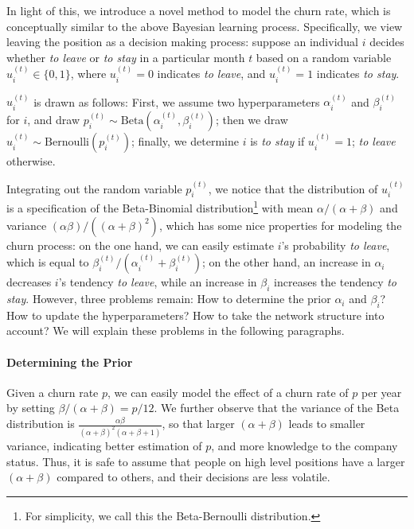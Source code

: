 \documentclass[tcn = 37075, sheet = false, abstract = false]{mcmthesis}
\begin{document}
	In light of this, we introduce a novel method to model the churn rate, which is conceptually similar to the above Bayesian learning process. Specifically, we view leaving the position as a decision making process: suppose an individual $i$ decides whether \textit{to leave} or \textit{to stay} in a particular month $t$ based on a random variable $u_{i}^{(t)} \in \{0, 1\}$, where $u_{i}^{(t)} = 0$ indicates \textit{to leave}, and $u_{i}^{(t)}=1$ indicates \textit{to stay}. 
	
	$u_{i}^{(t)}$ is drawn as follows: First, we assume two hyperparameters $\alpha_{i}^{(t)}$ and $\beta_{i}^{(t)}$ for $i$, and draw $\displaystyle   p_{i}^{(t)} \sim \mathrm{Beta}(\alpha_{i}^{(t)}, \beta_{i}^{(t)})$; then we draw $\displaystyle u_{i}^{(t)} \sim \mathrm{Bernoulli}(p_{i}^{(t)})$; finally, we determine $i$ is \textit{to stay} if $u_{i}^{(t)}=1$; \textit{to leave} otherwise.
	
	Integrating out the random variable $p_{i}^{(t)}$, we notice that the distribution of $u_{i}^{(t)}$ is a specification of the Beta-Binomial distribution\footnote{For simplicity, we call this the Beta-Bernoulli distribution.} with mean $\alpha / (\alpha + \beta)$ and variance $(\alpha\beta)/((\alpha+\beta)^2)$, which has some nice properties for modeling the churn process: on the one hand, we can easily estimate $i$'s probability \textit{to leave}, which is equal to $\beta_{i}^{(t)} /(\alpha_{i}^{(t)}+\beta_{i}^{(t)})$; on the other hand, an increase in $\alpha_i$ decreases $i$'s tendency \textit{to leave}, while an increase in $\beta_i$ increases the tendency \textit{to stay}. However, three problems remain: How to determine the prior $\alpha_i$ and $\beta_i$? How to update the hyperparameters? How to take the network structure into account? 
	We will explain these problems in the following paragraphs.
	
	\paragraph{Determining the Prior} Given a churn rate $p$, we can easily model the effect of a churn rate of $p$ per year by setting $\beta / (\alpha + \beta) = p / 12$. We further observe that the variance of the Beta distribution is $\displaystyle \frac{\alpha\beta}{(\alpha+\beta)^2(\alpha+\beta+1)}$, so that larger $(\alpha + \beta)$ leads to smaller variance, indicating better estimation of $p$, and more knowledge to the company status. Thus, it is safe to assume that people on high level positions have a larger $(\alpha+\beta)$ compared to others, and their decisions are less volatile.
	
\end{document}
